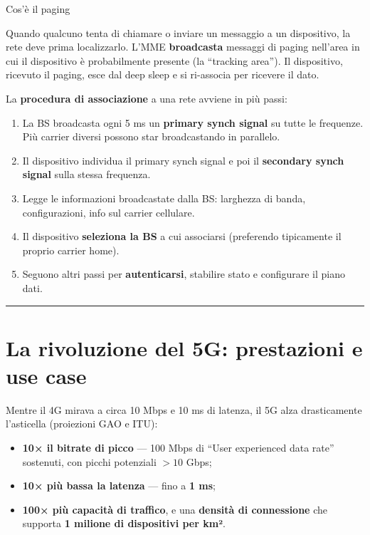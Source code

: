 \documentclass[
  italian,
  openany]{book}
\providecommand{\tightlist}{%
  \setlength{\itemsep}{0pt}\setlength{\parskip}{0pt}}
\begin{document}
\begin{calloutnote}{Cos’è il paging}

Quando qualcuno tenta di chiamare o inviare un messaggio a un
dispositivo, la rete deve prima localizzarlo. L'MME \textbf{broadcasta}
messaggi di paging nell'area in cui il dispositivo è probabilmente
presente (la ``tracking area''). Il dispositivo, ricevuto il paging,
esce dal deep sleep e si ri-associa per ricevere il dato.

\end{calloutnote}

La \textbf{procedura di associazione} a una rete avviene in più passi:

\begin{enumerate}
\def\labelenumi{\arabic{enumi}.}
\tightlist
\item
  La BS broadcasta ogni 5 ms un \textbf{primary synch signal} su tutte
  le frequenze. Più carrier diversi possono star broadcastando in
  parallelo.
\item
  Il dispositivo individua il primary synch signal e poi il
  \textbf{secondary synch signal} sulla stessa frequenza.
\item
  Legge le informazioni broadcastate dalla BS: larghezza di banda,
  configurazioni, info sul carrier cellulare.
\item
  Il dispositivo \textbf{seleziona la BS} a cui associarsi (preferendo
  tipicamente il proprio carrier home).
\item
  Seguono altri passi per \textbf{autenticarsi}, stabilire stato e
  configurare il piano dati.
\end{enumerate}

\begin{center}\rule{0.5\linewidth}{0.5pt}\end{center}

\section{La rivoluzione del 5G: prestazioni e use
case}\label{la-rivoluzione-del-5g-prestazioni-e-use-case}

Mentre il 4G mirava a circa 10 Mbps e 10 ms di latenza, il 5G alza
drasticamente l'asticella (proiezioni GAO e ITU):

\begin{itemize}
\tightlist
\item
  \textbf{10× il bitrate di picco} --- 100 Mbps di ``User experienced
  data rate'' sostenuti, con picchi potenziali \(> 10\) Gbps;
\item
  \textbf{10× più bassa la latenza} --- fino a \textbf{1 ms};
\item
  \textbf{100× più capacità di traffico}, e una \textbf{densità di
  connessione} che supporta \textbf{1 milione di dispositivi per km²}.
\end{itemize}
\end{document}

